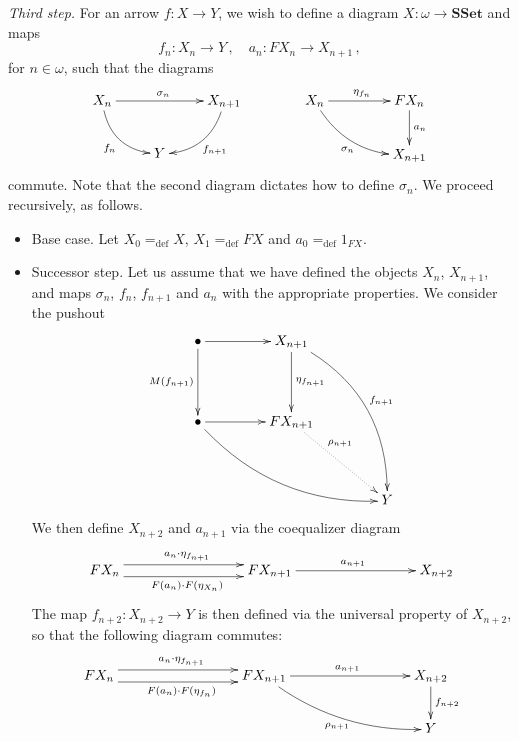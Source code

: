 \documentclass[reqno,10pt,a4paper,oneside]{amsart}
\theoremstyle{definition}
\newcommand{\defeq}{=_{\mathrm{def}}}
\newcommand{\co}{\colon}
\newcommand{\SSet}{\mathbf{SSet}}
\begin{document}
 \medskip

\noindent 
 {\itshape Third step.}  For an arrow $f \co X \rightarrow Y$, we wish to define a diagram $X \co  \omega \to \SSet$
 and  maps 
 \[
 f_n \co X_n \to Y \, , \quad a_{n} \co FX_n \to X_{n+1} \, ,
 \] 
 for $n \in \omega$, such that the diagrams
 \[
 \xymatrix{
  X_n   \ar@/_1pc/[dr]_-{f_n}  \ar[rr]^{\sigma_n} &   & X_{n+1} \ar@/^1pc/[dl]^-{f_{n+1}}   \\
   &  Y &  } \qquad \qquad 
  \xymatrix@C=1.5cm{
  X_n \ar[r]^{\eta_{f_n}}  \ar@/_1pc/[dr]_{\sigma_n} & FX_n \ar[d]^{a_{n}} \\ 
   & X_{n+1} }
   \]
   commute. 
Note that the second diagram dictates how to define $\sigma_n$. We proceed recursively, as follows.
 
 \begin{itemize}
 \item Base case. Let $X_0 \defeq X$, $X_1 \defeq FX$ and $a_0 \defeq 1_{FX}$.
 \item Successor step. Let us assume that we have defined the objects $X_n$, $X_{n+1}$, and maps
 $\sigma_n$, $f_n$, $f_{n+1}$ and  $a_{n}$ with the appropriate 
 properties. We consider the pushout
 \[
   \xymatrix@C=1.5cm@R=1.5cm{
 \bullet \ar[r]  \ar[d]_{M(f_{n+1})} & X_{n+1} \ar[d]^{\eta_{f_{n+1}}} \ar@/^1.8pc/[ddr]^{f_{n+1}} \\
\bullet \ar[r] \ar@/_1.5pc/[drr]  & FX_{n+1}\ar@{.>}[dr]^-(.3){\rho_{n+1}} \\ 
   & & Y  }
 \]
We then define $X_{n+2}$ and $a_{n+1}$ via  the coequalizer diagram
 \[
 \xymatrix@=3cm{
 FX_n \ar@<1ex>[r]^{a_n \cdot \eta_{f_{n+1}}}  \ar@<-1ex>[r]_{ F(a_n) \cdot F(\eta_{X_n})} & 
 F X_{n+1}   \ar[r]^{a_{n+1}} & X_{n+2} }
 \]
 The map $f_{n+2} \co X_{n+2} \to Y$ is then defined via the universal property of $X_{n+2}$,
 so that the following diagram commutes:
 \[
 \xymatrix@C=3cm{
 FX_n \ar@<1ex>[r]^{a_n \cdot \eta_{f_{n+1}}}  \ar@<-1ex>[r]_{ F(a_n) \cdot F(\eta_{f_n})} & 
 F X_{n+1}   \ar[r]^{a_{n+1}} \ar@/_1pc/[dr]_{\rho_{n+1}} & X_{n+2}  \ar[d]^{f_{n+2}}  \\ 
  & & Y }
 \] 
 \end{itemize}
 
 \medskip
 
\end{document}
